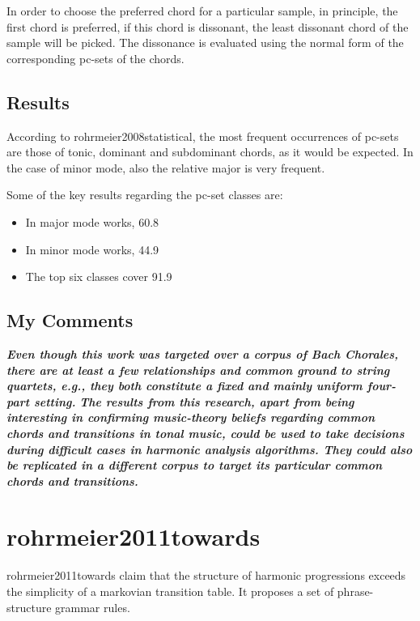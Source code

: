 			In order to choose the preferred chord for a particular sample, in principle, the first chord is preferred, if this chord is dissonant, the least dissonant chord of the sample will be picked. The dissonance is evaluated using the normal form of the corresponding pc-sets of the chords.

		\subsection{Results}
			According to rohrmeier2008statistical, the most frequent occurrences of pc-sets are those of tonic, dominant and subdominant chords, as it would be expected. In the case of minor mode, also the relative major is very frequent.

			Some of the key results regarding the pc-set classes are:
			\begin{itemize}
				\item In major mode works, 60.8%
				\item In minor mode works, 44.9%
				\item The top six classes cover 91.9%
			\end{itemize}


		\subsection{My Comments}
			\emph{\textbf{
				Even though this work was targeted over a corpus of Bach Chorales, there are at least a few relationships and common ground to string quartets, e.g., they both constitute a fixed and mainly uniform four-part setting.
			}}
			\emph{\textbf{
				The results from this research, apart from being interesting in confirming music-theory beliefs regarding common chords and transitions in tonal music, could be used to take decisions during difficult cases in harmonic analysis algorithms. They could also be replicated in a different corpus to target its particular common chords and transitions.
			}}

	\section{rohrmeier2011towards }
		rohrmeier2011towards claim that the structure of harmonic progressions exceeds the simplicity of a markovian transition table. It proposes a set of phrase-structure grammar rules.

